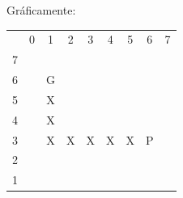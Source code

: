 \documentclass[11pt]{exam}
\begin{document}
\newpage

Gráficamente:

\begin{table}[H]
	\centering
	\begin{tabular}{ccccccccc}
		&
		0 &
		1 &
		2 &
		3 &
		4 &
		5 &
		6 &
		7 \\ \cline{2-9} 
		\multicolumn{1}{c|}{7} &
		\multicolumn{1}{c|}{\cellcolor[HTML]{000000}} &
		\multicolumn{1}{c|}{\cellcolor[HTML]{000000}} &
		\multicolumn{1}{c|}{\cellcolor[HTML]{000000}} &
		\multicolumn{1}{c|}{\cellcolor[HTML]{000000}} &
		\multicolumn{1}{c|}{\cellcolor[HTML]{000000}} &
		\multicolumn{1}{c|}{\cellcolor[HTML]{000000}} &
		\multicolumn{1}{c|}{\cellcolor[HTML]{000000}} &
		\multicolumn{1}{c|}{\cellcolor[HTML]{000000}} \\ \cline{2-9} 
		\multicolumn{1}{c|}{6} &
		\multicolumn{1}{c|}{\cellcolor[HTML]{000000}} &
		\multicolumn{1}{c|}{G} &
		\multicolumn{1}{c|}{} &
		\multicolumn{1}{c|}{} &
		\multicolumn{1}{c|}{} &
		\multicolumn{1}{c|}{} &
		\multicolumn{1}{c|}{} &
		\multicolumn{1}{c|}{\cellcolor[HTML]{000000}} \\ \cline{2-9} 
		\multicolumn{1}{c|}{5} &
		\multicolumn{1}{c|}{\cellcolor[HTML]{000000}} &
		\multicolumn{1}{c|}{X} &
		\multicolumn{1}{c|}{} &
		\multicolumn{1}{c|}{} &
		\multicolumn{1}{c|}{} &
		\multicolumn{1}{c|}{} &
		\multicolumn{1}{c|}{} &
		\multicolumn{1}{c|}{\cellcolor[HTML]{000000}} \\ \cline{2-9} 
		\multicolumn{1}{c|}{4} &
		\multicolumn{1}{c|}{\cellcolor[HTML]{000000}} &
		\multicolumn{1}{c|}{X} &
		\multicolumn{1}{c|}{} &
		\multicolumn{1}{c|}{} &
		\multicolumn{1}{c|}{} &
		\multicolumn{1}{c|}{} &
		\multicolumn{1}{c|}{} &
		\multicolumn{1}{c|}{\cellcolor[HTML]{000000}} \\ \cline{2-9} 
		\multicolumn{1}{c|}{3} &
		\multicolumn{1}{c|}{\cellcolor[HTML]{000000}} &
		\multicolumn{1}{c|}{X} &
		\multicolumn{1}{c|}{X} &
		\multicolumn{1}{c|}{X} &
		\multicolumn{1}{c|}{X} &
		\multicolumn{1}{c|}{X} &
		\multicolumn{1}{c|}{P} &
		\multicolumn{1}{c|}{\cellcolor[HTML]{000000}} \\ \cline{2-9} 
		\multicolumn{1}{c|}{2} &
		\multicolumn{1}{c|}{\cellcolor[HTML]{000000}} &
		\multicolumn{1}{c|}{} &
		\multicolumn{1}{c|}{} &
		\multicolumn{1}{c|}{} &
		\multicolumn{1}{c|}{} &
		\multicolumn{1}{c|}{} &
		\multicolumn{1}{c|}{} &
		\multicolumn{1}{c|}{\cellcolor[HTML]{000000}} \\ \cline{2-9} 
		\multicolumn{1}{c|}{1} &
		\multicolumn{1}{c|}{\cellcolor[HTML]{000000}} &

\end{tabular}
\end{table}
\end{document}
